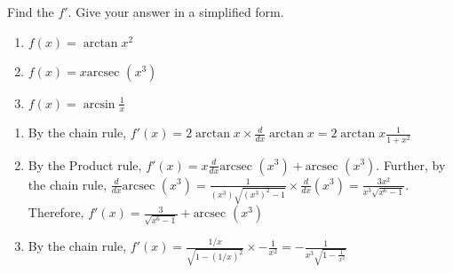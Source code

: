 \begin{Exercise}[label=invtrig1]
Find the $f'$. Give your answer in a simplified form. 
\begin{enumerate}
\item $f(x) = \arctan{x}^2$
\item $f(x) = x\text{arcsec }(x^3)$
\item $f(x) = \arcsin{\frac{1}{x}}$
\end{enumerate}
\end{Exercise}

\begin{Answer}[ref=invtrig1]
\begin{enumerate}
\item By the chain rule, $f'(x) = 2\arctan{x} \times \frac{d}{dx}\arctan{x} = 2\arctan{x}\frac{1}{1 + x^2}$
\item By the Product rule, $f'(x) = x \frac{d}{dx}\text{arcsec }(x^3) + \text{arcsec }(x^3)$. Further, by the chain rule, $\frac{d}{dx}\text{arcsec }(x^3) = \frac{1}{(x^3)\sqrt{(x^3)^2-1}} \times \frac{d}{dx}(x^3) = \frac{3x^2}{x^3\sqrt{x^6-1}}$. Therefore, $f'(x) = \frac{3}{\sqrt{x^6-1}} + \text{arcsec }(x^3)$
\item By the chain rule, $f'(x) = \frac{1/x}{\sqrt{1-(1/x)^2}} \times - \frac{1}{x^2} = - \frac{1}{x^3\sqrt{1-\frac{1}{x^2}}}$
\end{enumerate}
\end{Answer}